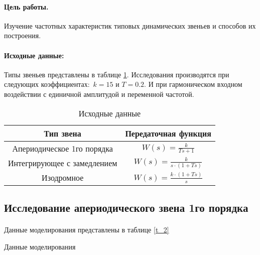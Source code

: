 \documentclass[a4paper,12pt]{article}
\renewcommand{\arraystretch}{1.5}
\begin{document}
	
	\paragraph{Цель работы.} 	Изучение частотных характеристик типовых динамических звеньев и способов их построения. 
	\paragraph {Исходные данные:} Типы звеньев представлены в таблице \ref{t_1}. Исследования производятся при следующих коэффициентах:~$k=15$ и $T=0.2$. И при гармоническом входном воздействии с единичной амплитудой и переменной частотой.
	\begin{table}[h]
		\caption{Исходные данные}
		\renewcommand{\arraystretch}{2} 
		\begin{center}
			\begin{tabular}{|c|c|}
				\hline
				Тип звена & Передаточная функция \\ \hline
				Апериодическое 1го порядка & $\displaystyle W(s)=\frac{k}{Ts+1}$ \\ \hline
				Интегрирующее с замедлением & $\displaystyle W(s)=\frac{k}{s\cdot (1+Ts)}$ \\ \hline
				Изодромное & $\displaystyle W(s)=\frac{k\cdot (1+Ts)}{s}$ \\ \hline
			\end{tabular}
		\end{center}
		\label{t_1}
	\end{table}
	
	\newpage
	\begin{center}
	\section{Исследование апериодического звена 1го порядка}
	\end{center}
	\paragraph{} Данные моделирования представлены в таблице \ref{t_2}
		\begin{table}[h!]
			\centering
				\caption{Данные моделирования} \label{t_2}
		\end{table}
	\newpage
\end{document}
